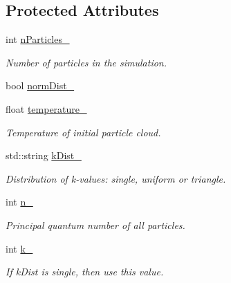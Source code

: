 \subsection*{Protected Attributes}
\begin{DoxyCompactItemize}
\item 
\hypertarget{classParticlesConfig_aade47aeb4b98d5508acfe3860de96432}{int \hyperlink{classParticlesConfig_aade47aeb4b98d5508acfe3860de96432}{n\+Particles\+\_\+}}\label{classParticlesConfig_aade47aeb4b98d5508acfe3860de96432}

\begin{DoxyCompactList}\small\item\em Number of particles in the simulation. \end{DoxyCompactList}\item 
bool \hyperlink{classParticlesConfig_a414f45bab84f23499f8105f8c200db21}{norm\+Dist\+\_\+}
\item 
\hypertarget{classParticlesConfig_ac1769cefe2613f5a157417cba30d6d40}{float \hyperlink{classParticlesConfig_ac1769cefe2613f5a157417cba30d6d40}{temperature\+\_\+}}\label{classParticlesConfig_ac1769cefe2613f5a157417cba30d6d40}

\begin{DoxyCompactList}\small\item\em Temperature of initial particle cloud. \end{DoxyCompactList}\item 
\hypertarget{classParticlesConfig_ac69e5fa7f53653feafc94f64978bae54}{std\+::string \hyperlink{classParticlesConfig_ac69e5fa7f53653feafc94f64978bae54}{k\+Dist\+\_\+}}\label{classParticlesConfig_ac69e5fa7f53653feafc94f64978bae54}

\begin{DoxyCompactList}\small\item\em Distribution of k-\/values\+: single, uniform or triangle. \end{DoxyCompactList}\item 
\hypertarget{classParticlesConfig_acd4f891039360aad521cde44d61a465c}{int \hyperlink{classParticlesConfig_acd4f891039360aad521cde44d61a465c}{n\+\_\+}}\label{classParticlesConfig_acd4f891039360aad521cde44d61a465c}

\begin{DoxyCompactList}\small\item\em Principal quantum number of all particles. \end{DoxyCompactList}\item 
\hypertarget{classParticlesConfig_a1bd8be10c9d368c49bb5857bc02bb52a}{int \hyperlink{classParticlesConfig_a1bd8be10c9d368c49bb5857bc02bb52a}{k\+\_\+}}\label{classParticlesConfig_a1bd8be10c9d368c49bb5857bc02bb52a}

\begin{DoxyCompactList}\small\item\em If k\+Dist is single, then use this value. \end{DoxyCompactList}\end{DoxyCompactItemize}
